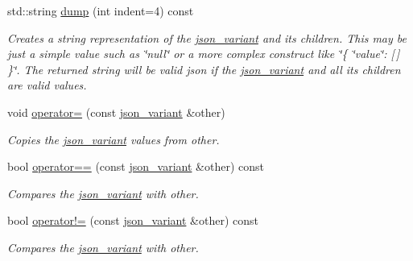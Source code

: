 \begin{DoxyCompactItemize}
std\+::string \hyperlink{classJSONLIB__NAMESPACE_1_1json__variant_a72d4a39d77b76f076354219edc6ea4a0}{dump} (int indent=4) const
\begin{DoxyCompactList}\small\item\em Creates a string representation of the \hyperlink{classJSONLIB__NAMESPACE_1_1json__variant}{json\+\_\+variant} and its children. This may be just a simple value such as \char`\"{}null\char`\"{} or a more complex construct like \char`\"{}\{ \char`\"{}value\char`\"{}\+: \mbox{[}$\,$\mbox{]} \}\char`\"{}. The returned string will be valid json if the \hyperlink{classJSONLIB__NAMESPACE_1_1json__variant}{json\+\_\+variant} and all its children are valid values. \end{DoxyCompactList}\item 
void \hyperlink{classJSONLIB__NAMESPACE_1_1json__variant_acab384801617885ba1dc3b965a456e7e}{operator=} (const \hyperlink{classJSONLIB__NAMESPACE_1_1json__variant}{json\+\_\+variant} \&other)
\begin{DoxyCompactList}\small\item\em Copies the \hyperlink{classJSONLIB__NAMESPACE_1_1json__variant}{json\+\_\+variant} values from {\ttfamily other}. \end{DoxyCompactList}\item 
bool \hyperlink{classJSONLIB__NAMESPACE_1_1json__variant_aef1fc1a342cc170da06e0d3eb1299aad}{operator==} (const \hyperlink{classJSONLIB__NAMESPACE_1_1json__variant}{json\+\_\+variant} \&other) const
\begin{DoxyCompactList}\small\item\em Compares the \hyperlink{classJSONLIB__NAMESPACE_1_1json__variant}{json\+\_\+variant} with {\ttfamily other}. \end{DoxyCompactList}\item 
bool \hyperlink{classJSONLIB__NAMESPACE_1_1json__variant_a7672a255983f3142523b3680e737d021}{operator!=} (const \hyperlink{classJSONLIB__NAMESPACE_1_1json__variant}{json\+\_\+variant} \&other) const
\begin{DoxyCompactList}\small\item\em Compares the \hyperlink{classJSONLIB__NAMESPACE_1_1json__variant}{json\+\_\+variant} with {\ttfamily other}. \end{DoxyCompactList}\end{DoxyCompactItemize}
